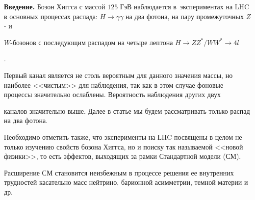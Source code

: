 


\date{19/XII/2014}










\makerutitle











\textbf{Введение.} Бозон Хиггса с массой $125$ ГэВ наблюдается в~экспериментах на LHC в основных процессах распада: $H \rightarrow \gamma \gamma$ на два фотона, на пару промежуточных $Z$- и

$W$-бозонов с последующим распадом на четыре лептона $H \rightarrow Z Z^{*}/W W^{*} \rightarrow 4 l$

\cite{gurskaya:bib:Boos, gurskaya:bib:Lanev}. 

Первый канал является не столь вероятным для данного значения массы, но наиболее <<чистым>> для наблюдения, так как в этом случае фоновые процессы значительно ослаблены. Вероятность наблюдения других двух

каналов значительно выше. Далее в статье мы будем рассматривать только распад на два фотона.



Необходимо отметить также, что эксперименты на LHC посвящены в целом не только изучению свойств бозона Хиггса, но и поиску так называемой <<новой физики>>, то есть  эффектов, выходящих за рамки Стандартной модели (СМ). 

Расширение СМ становится неизбежным в процессе решения ее внутренних трудностей касательно масс нейтрино, барионной асимметрии, темной материи и др. 

